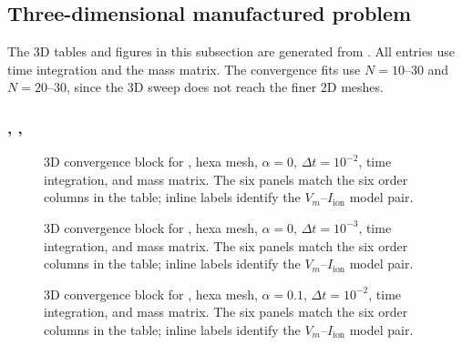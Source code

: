 \subsection{Three-dimensional manufactured problem}
The 3D tables and figures in this subsection are generated from
.
All entries use  time integration and the  mass matrix. The convergence fits use $N=10$--$30$ and $N=20$--$30$, since the 3D sweep does not reach the finer 2D meshes.

\subsubsection{, , }



\begin{figure}[p]
\centering
{}
\caption{3D convergence block for , hexa mesh, $\alpha=0$, $\Delta t=10^{-2}$,  time integration, and  mass matrix. The six panels match the six order columns in the table; inline labels identify the $V_m$--$I_{\mathrm{ion}}$ model pair.}
\label{fig:results-3d-picard-hexa-alpha-0p0e00-1p0em02}
\end{figure}
\FloatBarrier

\begin{figure}[p]
\centering
{}
\caption{3D convergence block for , hexa mesh, $\alpha=0$, $\Delta t=10^{-3}$,  time integration, and  mass matrix. The six panels match the six order columns in the table; inline labels identify the $V_m$--$I_{\mathrm{ion}}$ model pair.}
\label{fig:results-3d-picard-hexa-alpha-0p0e00-1p0em03}
\end{figure}
\FloatBarrier

\begin{figure}[p]
\centering
{}
\caption{3D convergence block for , hexa mesh, $\alpha=0.1$, $\Delta t=10^{-2}$,  time integration, and  mass matrix. The six panels match the six order columns in the table; inline labels identify the $V_m$--$I_{\mathrm{ion}}$ model pair.}
\label{fig:results-3d-picard-hexa-alpha-1p0em01-1p0em02}
\end{figure}
\FloatBarrier

